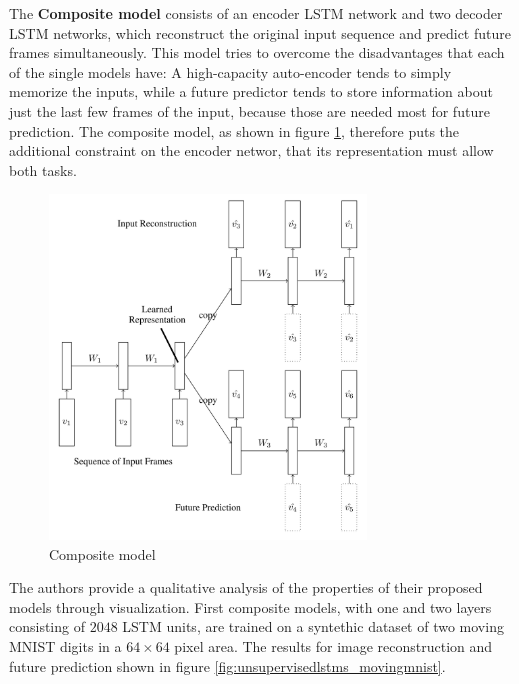 The \textbf{Composite model} consists of an encoder LSTM network and two decoder LSTM networks, which reconstruct the original input sequence and predict future frames simultaneously.
This model tries to overcome the disadvantages that each of the single models have: A high-capacity auto-encoder tends to simply memorize the inputs, while a future predictor tends to store information about just the last few frames of the input, because those are needed most for future prediction.
The composite model, as shown in figure \ref{fig:unsupervisedlstms_composite}, therefore puts the additional constraint on the encoder networ, that its representation must allow both tasks.

\begin{figure}[H]
    \centering
    \includegraphics[width=0.75\textwidth]{img_deep/unsupervisedlstms_composite}
    \caption{Composite model \cite{srivastava_unsupervised_2015}}
    \label{fig:unsupervisedlstms_composite}
\end{figure}

The authors provide a qualitative analysis of the properties of their proposed models through visualization.
First composite models, with one and two layers consisting of $2048$ LSTM units, are trained on a syntethic dataset of two moving MNIST digits in a $64 \times 64$ pixel area.
The results for image reconstruction and future prediction shown in figure \ref{fig:unsupervisedlstms_movingmnist}.

